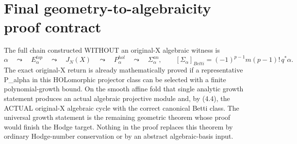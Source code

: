 \documentclass[11pt]{article}
\begin{document}
\section{Final geometry-to-algebraicity proof contract}
The full chain constructed WITHOUT
an original-X algebraic witness is
\[
 \alpha\quad\leadsto\quad
 E_\alpha^{top}\quad\leadsto\quad
 J_N(X)\quad\leadsto\quad
 P_\alpha^{hol}\quad\leadsto\quad
 \Sigma_\alpha^{an},\qquad
 [\Sigma_\alpha]_{Betti}
  =(-1)^{p-1}m(p-1)!\,q^*\alpha .
\]
The exact original-X return
is already mathematically proved
if a representative P_alpha
in this HOLomorphic projector
class can be selected with
a finite polynomial-growth bound.
On the smooth affine fold that
single analytic growth statement
produces an actual algebraic
projective module and, by (4.4),
the ACTUAL original-X algebraic
cycle with the correct canonical
Betti class. The universal growth
statement is the remaining
geometric theorem whose proof
would finish the Hodge target.
Nothing in the proof replaces
this theorem by ordinary
Hodge-number conservation or
by an abstract algebraic-basis
input.
\end{document}
